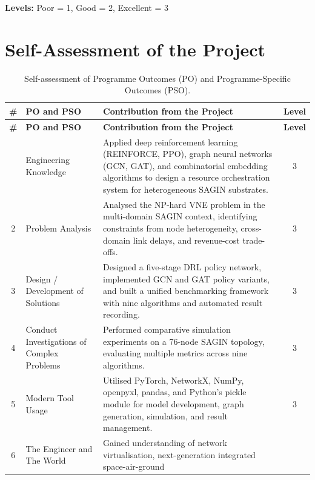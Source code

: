 \documentclass[12pt,a4paper]{report}
\begin{document}
\vspace{0.4em}
\noindent\textbf{Levels:} Poor = 1, \quad Good = 2, \quad Excellent = 3

\chapter{Self-Assessment of the Project}
\label{app:self-assessment}

\begin{center}
\renewcommand{\arraystretch}{1.5}
\begin{longtable}{|c|>{\centering\arraybackslash}m{2.6cm}|>{\centering\arraybackslash}m{7cm}|c|}
\caption{Self-assessment of Programme Outcomes (PO) and Programme-Specific Outcomes (PSO).}
\label{tab:self-assessment}\\
\hline
\textbf{\#} & \textbf{PO and PSO} & \textbf{Contribution from the Project} & \textbf{Level}\\
\hline
\endfirsthead
\hline
\textbf{\#} & \textbf{PO and PSO} & \textbf{Contribution from the Project} & \textbf{Level}\\
\hline
\endhead
\hline
\endfoot
\hline
\endlastfoot
1 & Engineering Knowledge &
Applied deep reinforcement learning (REINFORCE, PPO), graph neural networks (GCN, GAT),
and combinatorial embedding algorithms to design a resource orchestration system for
heterogeneous SAGIN substrates. & 3 \\
\hline
2 & Problem Analysis &
Analysed the NP-hard VNE problem in the multi-domain SAGIN context, identifying constraints
from node heterogeneity, cross-domain link delays, and revenue-cost trade-offs. & 3 \\
\hline
3 & Design / Development of Solutions &
Designed a five-stage DRL policy network, implemented GCN and GAT policy variants, and built
a unified benchmarking framework with nine algorithms and automated result recording. & 3 \\
\hline
4 & Conduct Investigations of Complex Problems &
Performed comparative simulation experiments on a 76-node SAGIN topology, evaluating multiple
metrics across nine algorithms. & 3 \\
\hline
5 & Modern Tool Usage &
Utilised PyTorch, NetworkX, NumPy, openpyxl, pandas, and Python's pickle module for model
development, graph generation, simulation, and result management. & 3 \\
\hline
6 & The Engineer and The World &
Gained understanding of network virtualisation, next-generation integrated space-air-ground

\end{longtable}
\end{center}
\end{document}
